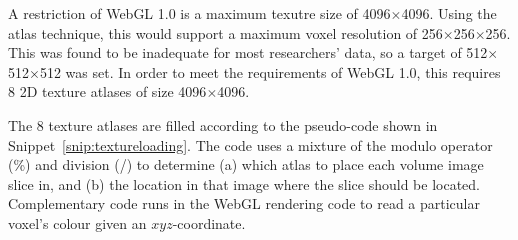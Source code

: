 A restriction of WebGL 1.0 is a maximum texutre size of 4096$\times$4096.
Using the atlas technique, this would support a maximum voxel resolution of 256$\times$256$\times$256.
This was found to be inadequate for most researchers' data, so a target of 512$\times$512$\times$512 was set.
In order to meet the requirements of WebGL 1.0, this requires 8 2D texture atlases of size 4096$\times$4096.

The 8 texture atlases are filled according to the pseudo-code shown in Snippet~\ref{snip:textureloading}.
The code uses a mixture of the modulo operator (\%) and division (/) to determine (a) which atlas to place each volume image slice in, and (b) the location in that image where the slice should be located.
Complementary code runs in the WebGL rendering code to read a particular voxel's colour given an $xyz$-coordinate.

